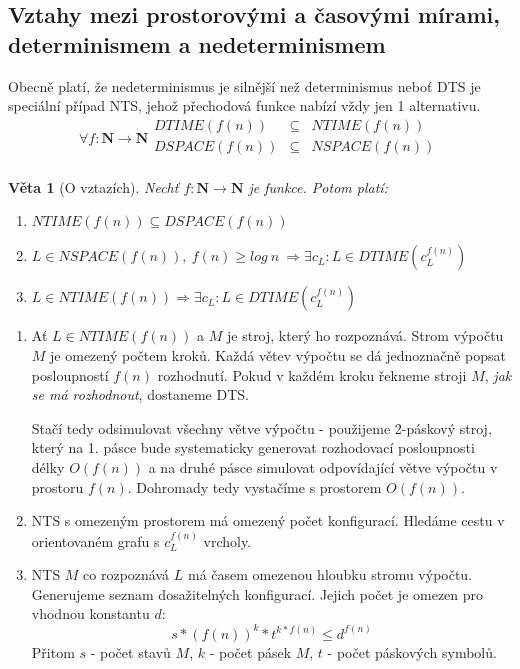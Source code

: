 \documentclass[a4paper]{article}      %
\newtheorem{theorem}{Věta}[section]
\newenvironment{proof}[1][Důkaz]{\begin{trivlist}
\item[\hskip \labelsep {\bfseries #1}]}{\end{trivlist}}
\begin{document}
\subsection{Vztahy mezi prostorovými a časovými mírami, determinismem a nedeterminismem}
Obecně platí, že nedeterminismus je silnější než determinismus neboť DTS je speciální případ NTS,
jehož přechodová funkce nabízí vždy jen 1 alternativu.
\[
\forall f: \mathbf{N} \rightarrow \mathbf{N}
\begin{array}{lcr}
DTIME(f(n)) & \subseteq & NTIME(f(n))\\
DSPACE(f(n)) & \subseteq & NSPACE(f(n))\\
\end{array}
\]

\begin{theorem}[O vztazích]
Nechť $f: \mathbf{N} \rightarrow \mathbf{N}$ je funkce. Potom platí:
\begin{enumerate}
\item $NTIME(f(n)) \subseteq DSPACE(f(n))$
\item $L \in NSPACE(f(n)),\ f(n)\geq log\ n\ \Rightarrow \exists c_{L}: L\in DTIME(c_{L}^{f(n)})$
\item $L \in NTIME(f(n)) \Rightarrow \exists c_{L}: L \in DTIME(c_{L}^{f(n)})$
\end{enumerate}
\end{theorem}

\begin{proof}
\begin{enumerate}
\item Ať $L\in NTIME(f(n))$ a $M$ je stroj, který ho rozpoznává. Strom výpočtu $M$ je omezený počtem kroků. Každá větev výpočtu se dá jednoznačně popsat posloupností $f(n)$ rozhodnutí. Pokud v každém kroku řekneme stroji $M$, \emph{jak se má rozhodnout}, dostaneme DTS.

Stačí tedy odsimulovat všechny větve výpočtu - použijeme 2-páskový stroj, který na 1. pásce bude systematicky generovat rozhodovací posloupnosti délky $O(f(n))$ a na druhé pásce simulovat odpovídající větve výpočtu v prostoru $f(n)$. Dohromady tedy vystačíme s prostorem $O(f(n))$. 
\item NTS s omezeným prostorem má omezený počet konfigurací. Hledáme cestu v orientovaném grafu s $c_{L}^{f(n)}$ vrcholy.
\item NTS $M$ co rozpoznává $L$ má časem omezenou hloubku stromu výpočtu. Generujeme seznam dosažitelných konfigurací.
Jejich počet je omezen pro vhodnou konstantu $d$:
\[
s*(f(n))^{k}*t^{k*f(n)}\leq d^{f(n)}
\]
Přitom $s$ - počet stavů $M$, $k$ - počet pásek $M$, $t$ - počet páskových symbolů.
\end{enumerate}
\end{proof}
\end{document}
